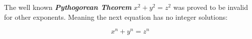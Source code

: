 \documentclass[14pt]{article}
\begin{document}
The well known \textbf{\textit{Pythogorean Theorem}} \(x^2 + y^2 = z^2\) was 
proved to be invalid for other exponents. Meaning the next equation has no integer solutions:

\[ x^n + y^n = z^n \]
\end{document}
